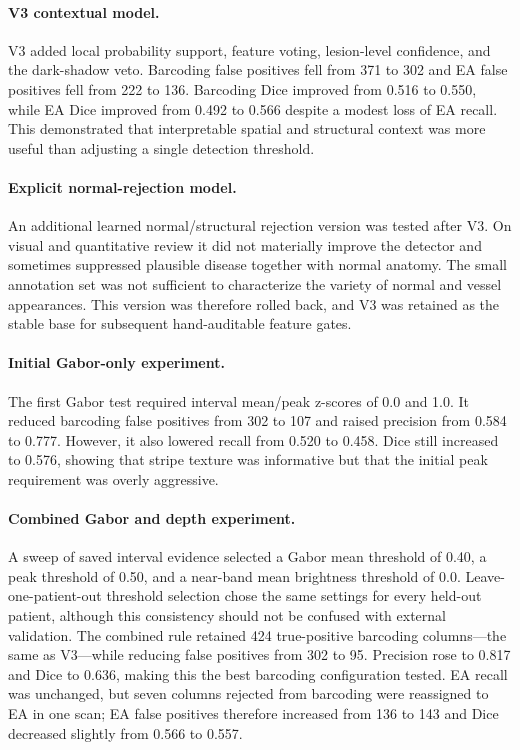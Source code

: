 \documentclass[11pt]{article}
\begin{document}
\paragraph{V3 contextual model.}
V3 added local probability support, feature voting, lesion-level confidence,
and the dark-shadow veto.  Barcoding false positives fell from 371 to 302 and
EA false positives fell from 222 to 136.  Barcoding Dice improved from 0.516
to 0.550, while EA Dice improved from 0.492 to 0.566 despite a modest loss of
EA recall.  This demonstrated that interpretable spatial and structural
context was more useful than adjusting a single detection threshold.

\paragraph{Explicit normal-rejection model.}
An additional learned normal/structural rejection version was tested after V3.
On visual and quantitative review it did not materially improve the detector
and sometimes suppressed plausible disease together with normal anatomy.  The
small annotation set was not sufficient to characterize the variety of normal
and vessel appearances.  This version was therefore rolled back, and V3 was
retained as the stable base for subsequent hand-auditable feature gates.

\paragraph{Initial Gabor-only experiment.}
The first Gabor test required interval mean/peak z-scores of 0.0 and 1.0.  It
reduced barcoding false positives from 302 to 107 and raised precision from
0.584 to 0.777.  However, it also lowered recall from 0.520 to 0.458.  Dice
still increased to 0.576, showing that stripe texture was informative but that
the initial peak requirement was overly aggressive.

\paragraph{Combined Gabor and depth experiment.}
A sweep of saved interval evidence selected a Gabor mean threshold of 0.40, a
peak threshold of 0.50, and a near-band mean brightness threshold of 0.0.
Leave-one-patient-out threshold selection chose the same settings for every
held-out patient, although this consistency should not be confused with
external validation.  The combined rule retained 424 true-positive barcoding
columns---the same as V3---while reducing false positives from 302 to 95.
Precision rose to 0.817 and Dice to 0.636, making this the best barcoding
configuration tested.  EA recall was unchanged, but seven columns rejected
from barcoding were reassigned to EA in one scan; EA false positives therefore
increased from 136 to 143 and Dice decreased slightly from 0.566 to 0.557.
\end{document}

